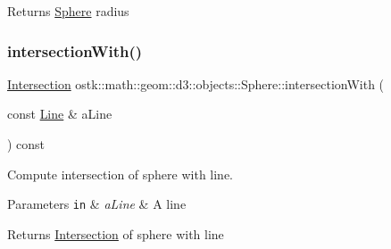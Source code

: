 \begin{DoxyReturn}{Returns}
\hyperlink{classostk_1_1math_1_1geom_1_1d3_1_1objects_1_1_sphere}{Sphere} radius 
\end{DoxyReturn}
\mbox{\label{classostk_1_1math_1_1geom_1_1d3_1_1objects_1_1_sphere_afbae10b116900f5383913e564c0ec91a}} 
\subsubsection{\texorpdfstring{intersection\+With()}{intersectionWith()}\hspace{0.1cm}{\footnotesize\ttfamily [1/5]}}
{\footnotesize\ttfamily \hyperlink{classostk_1_1math_1_1geom_1_1d3_1_1_intersection}{Intersection} ostk\+::math\+::geom\+::d3\+::objects\+::\+Sphere\+::intersection\+With (\begin{DoxyParamCaption}\item[{const \hyperlink{classostk_1_1math_1_1geom_1_1d3_1_1objects_1_1_line}{Line} \&}]{a\+Line }\end{DoxyParamCaption}) const}



Compute intersection of sphere with line. 


\begin{DoxyParams}[1]{Parameters}
\mbox{\tt in}  & {\em a\+Line} & A line \\
\hline
\end{DoxyParams}
\begin{DoxyReturn}{Returns}
\hyperlink{classostk_1_1math_1_1geom_1_1d3_1_1_intersection}{Intersection} of sphere with line 
\end{DoxyReturn}
\mbox{\label{classostk_1_1math_1_1geom_1_1d3_1_1objects_1_1_sphere_a8980be0640bcfb44f61b913f904c89a2}} 
